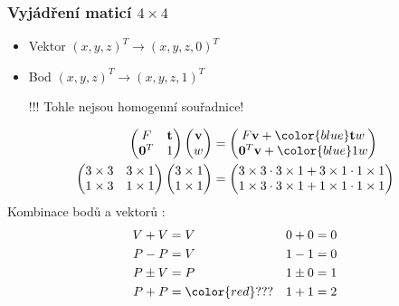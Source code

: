 \begin{frame}
    \frametitle{Vyjádření maticí $4\times4$}
    \begin{itemize}
        \item Vektor $(x,y,z)^T \rightarrow (x,y,z,0)^T$
        \item Bod $(x,y,z)^T \rightarrow (x,y,z,1)^T$
        \item[\color{red}!!!] Tohle nejsou homogenní souřadnice!
    \end{itemize}
    \pause
    \begin{align*}
        \begin{pmatrix}
            F & \V{t} \\
            \V{0}^T & 1
        \end{pmatrix}\begin{pmatrix}\V{v}\\w\end{pmatrix}
        &= \begin{pmatrix}
            F\V{v} + {\color{blue}\V{t}w} \\
            \V{0}^T\V{v} + {\color{blue}1w}
        \end{pmatrix} \\
        \begin{pmatrix}
            3\times3 & 3\times1 \\
            1\times3 & 1\times1
        \end{pmatrix}\begin{pmatrix}3\times1\\1\times1\end{pmatrix}
        &= \begin{pmatrix}
            3\times3 \cdot 3\times1 + 3\times1 \cdot 1\times1 \\
            1\times3 \cdot 3\times1 + 1\times1 \cdot 1\times1
        \end{pmatrix}
    \end{align*}
    \pause\vfill
    Kombinace bodů a vektorů :
    \begin{align*}
        V + V &= V & 0+0 &= 0 \\
        P - P &= V & 1-1 &= 0 \\
        P \pm V &= P & 1\pm 0 &= 1 \\
        P + P &= \color{red}??? & 1+1 &= 2
    \end{align*}
\end{frame}



